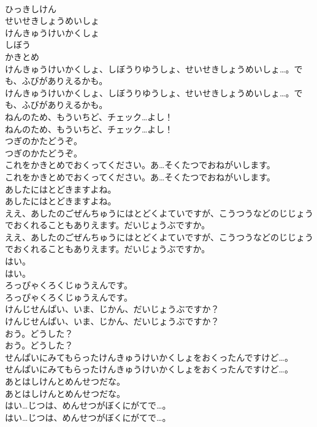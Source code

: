 \documentclass[8pt]{extreport}
\begin{document}
\begin{CJK}{UTF8}{min}
\\	ひっきしけん
\\	せいせきしょうめいしょ
\\	けんきゅうけいかくしょ
\\	しぼう
\\	かきとめ
\\	けんきゅうけいかくしょ、しぼうりゆうしょ、せいせきしょうめいしょ…。でも、ふびがありえるかも。	
\\	けんきゅうけいかくしょ、しぼうりゆうしょ、せいせきしょうめいしょ…。でも、ふびがありえるかも。 
\\	ねんのため、もういちど、チェック…よし！	
\\	ねんのため、もういちど、チェック…よし！ 
\\	つぎのかたどうぞ。	
\\	つぎのかたどうぞ。 
\\	これをかきとめでおくってください。あ…そくたつでおねがいします。	
\\	これをかきとめでおくってください。あ…そくたつでおねがいします。 
\\	あしたにはとどきますよね。	
\\	あしたにはとどきますよね。 
\\	ええ、あしたのごぜんちゅうにはとどくよていですが、こうつうなどのじじょうでおくれることもありえます。だいじょうぶですか。	
\\	ええ、あしたのごぜんちゅうにはとどくよていですが、こうつうなどのじじょうでおくれることもありえます。だいじょうぶですか。 
\\	はい。	
\\	はい。 
\\	ろっぴゃくろくじゅうえんです。	
\\	ろっぴゃくろくじゅうえんです。 
\\	けんじせんぱい、いま、じかん、だいじょうぶですか？	
\\	けんじせんぱい、いま、じかん、だいじょうぶですか？ 
\\	おう。どうした？	
\\	おう。どうした？ 
\\	せんぱいにみてもらったけんきゅうけいかくしょをおくったんですけど…。	
\\	せんぱいにみてもらったけんきゅうけいかくしょをおくったんですけど…。 
\\	あとはしけんとめんせつだな。	
\\	あとはしけんとめんせつだな。 
\\	はい…じつは、めんせつがぼくにがてで…。	
\\	はい…じつは、めんせつがぼくにがてで…。 

\end{CJK}
\end{document}
